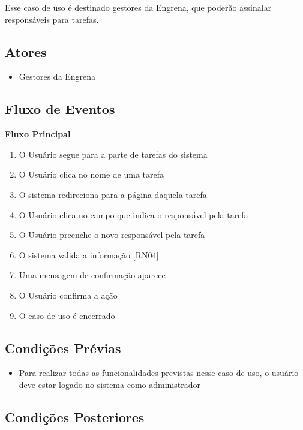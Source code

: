 \begin{apendicesenv}
Esse caso de uso é destinado gestores da Engrena, que poderão assinalar responsáveis para tarefas.

\subsection{Atores}

\begin{itemize}
  \item{Gestores da Engrena}
\end{itemize}


\subsection{Fluxo de Eventos}

\textbf{Fluxo Principal}

\begin{enumerate}
  \item{O Usuário segue para a parte de tarefas do sistema}
  \item{O Usuário clica no nome de uma tarefa}
  \item{O sistema redireciona para a página daquela tarefa}
  \item{O Usuário clica no campo que indica o responsável pela tarefa}
  \item{O Usuário preenche o novo responsável pela tarefa}
  \item{O sistema valida a informação [RN04]}
  \item{Uma mensagem de confirmação aparece}
  \item{O Usuário confirma a ação}
  \item{O caso de uso é encerrado}
\end{enumerate}

\subsection{Condições Prévias}
\begin{itemize}
\item{Para realizar todas as funcionalidades previstas nesse caso de uso, o usuário deve estar logado no sistema como administrador}
\end{itemize}

\subsection{Condições Posteriores}


\end{apendicesenv}
